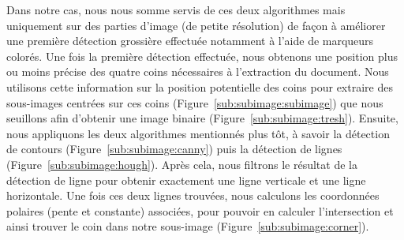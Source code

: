 Dans notre cas, nous nous somme servis de ces deux algorithmes mais uniquement sur des parties d'image (de petite résolution) de façon à améliorer une première détection grossière effectuée notamment à l'aide de marqueurs colorés. Une fois la première détection effectuée, nous obtenons une position plus ou moins précise des quatre coins nécessaires à l'extraction du document. Nous utilisons cette information sur la position potentielle des coins pour extraire des sous-images centrées sur ces coins (Figure~\ref{sub:subimage:subimage}) que nous seuillons afin d'obtenir une image binaire (Figure~\ref{sub:subimage:tresh}). Ensuite, nous appliquons les deux algorithmes mentionnés plus tôt, à savoir la détection de contours (Figure~\ref{sub:subimage:canny}) puis la détection de lignes (Figure~\ref{sub:subimage:hough}). Après cela, nous filtrons le résultat de la détection de ligne pour obtenir exactement une ligne verticale et une ligne horizontale. Une fois ces deux lignes trouvées, nous calculons les coordonnées polaires (pente et constante) associées, pour pouvoir en calculer l'intersection et ainsi trouver le coin dans notre sous-image (Figure~\ref{sub:subimage:corner}).


